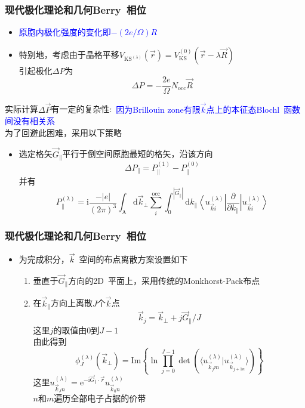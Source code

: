 \documentclass[cjk,slidestop,compress,mathserif,blue]{beamer}
\begin{document}
\frame
{
	\frametitle{现代极化理论和几何\textrm{Berry~}相位}
	\begin{itemize}
		\item \textcolor{blue}{原胞内极化强度的变化即$-(2e/\Omega)R$}
		\item 特别地，考虑由于晶格平移$V_{\mathrm{KS}^{(\lambda)}}(\vec r)=V_{\mathrm{KS}}^{(0)}(\vec r-\lambda\vec R)$\\
			引起极化$\Delta P$为
			\begin{displaymath}
				\Delta P=-\frac{2e}{\Omega}N_{\mathrm{occ}}\vec R
			\end{displaymath}
	\end{itemize}
	实际计算$\Delta\vec P$有一定的复杂性:~\textcolor{blue}{因为\textrm{Brillouin zone}有限$\vec k$点上的本征态\textrm{Blochl~}函数间没有相关系}\\
	为了回避此困难，采用以下策略
	\begin{itemize}
		\item 选定格矢$\vec G_{\lVert}$平行于倒空间原胞最短的格矢，沿该方向
			\begin{displaymath}
				\Delta P_{\lVert}=P_{\lVert}^{(1)}-P_{\lVert}^{(0)}
			\end{displaymath}
			并有
			\begin{displaymath}
				P_{\lVert}^{(\lambda)}=\mathrm{i}\frac{-|e|}{(2\pi)^3}\int_{\mathrm{A}}\mathrm{d}\vec k_{\bot}\sum_i^{\mathrm{occ}}\int_0^{|\vec G_{\lVert}|}\mathrm{d}k_{\lVert}\left\langle u_{\vec k i}^{(\lambda)}\right|\frac{\partial}{\partial k_{\lVert}}\left|u_{\vec k i}^{(\lambda)}\right\rangle
			\end{displaymath}

	\end{itemize}
}

\frame
{
	\frametitle{现代极化理论和几何\textrm{Berry~}相位}
	\begin{itemize}
		\item 为完成积分，$\vec k$~空间的布点离散方案设置如下
			\begin{enumerate}
				\item 垂直于$\vec G_{\lVert}$方向的2\textrm{D~}平面上，采用传统的\textrm{Monkhorst-Pack}布点
				\item 在$\vec k_{\lVert}$方向上离散$J$个$\vec k$点
\begin{displaymath}
	\vec k_j=\vec k_{\bot}+j\vec G_{\lVert}/J
\end{displaymath}
这里$j$的取值由0到$J-1$\\
由此得到
\begin{equation}
	\phi_J^{(\lambda)}(\vec k_{\bot})=\mathrm{Im}\left\{ \ln\prod_{j=0}^{J-1}\det(\langle u_{\vec k_j m}^{(\lambda)}|u_{\vec k_{j+1 n}}^{(\lambda)}\rangle) \right\}
	\label{eq:phase_angle}
\end{equation}
这里$u_{\vec k_J n}^{(\lambda)}=\mathrm{e}^{-\mathrm{i}\vec G_{\lVert}\cdot\vec r}u_{\vec k_0 n}^{(\lambda)}$\\
$n$和$m$遍历全部电子占据的价带
			\end{enumerate}
	\end{itemize}
}
\end{document}
